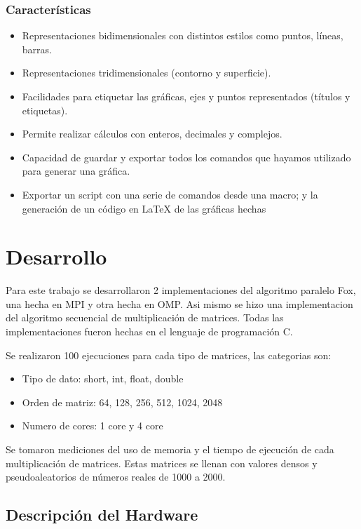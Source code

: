\documentclass[10pt]{IEEEtran}
\begin{document}
\subsubsection{Características}
\begin{itemize}
  \item Representaciones bidimensionales con distintos estilos como puntos, líneas, barras.
  \item Representaciones tridimensionales (contorno y superficie).
  \item Facilidades para etiquetar las gráficas, ejes y puntos representados (títulos y etiquetas).
  \item Permite realizar cálculos con enteros, decimales y complejos.
  \item Capacidad de guardar y exportar todos los comandos que hayamos utilizado para generar una gráfica.
  \item Exportar un script con una serie de comandos desde una macro; y la generación de un código en \LaTeX{} de las gráficas hechas
\end{itemize}

\section{Desarrollo}
Para este trabajo se desarrollaron 2 implementaciones del algoritmo paralelo Fox, una hecha en MPI y otra hecha en OMP. Asi mismo se hizo una implementacion del algoritmo secuencial de multiplicación de matrices. Todas las implementaciones fueron hechas en el lenguaje de programación C.

Se realizaron 100 ejecuciones para cada tipo de matrices, las categorias son:
\begin{itemize}
  \item Tipo de dato: short, int, float, double
  \item Orden de matriz: 64, 128, 256, 512, 1024, 2048
  \item Numero de cores: 1 core y 4 core
\end{itemize}

Se tomaron mediciones del uso de memoria y el tiempo de ejecución de cada multiplicación de matrices. Estas matrices se llenan con valores densos y pseudoaleatorios de números reales de 1000 a 2000.

\subsection{Descripción del Hardware}
\end{document}

